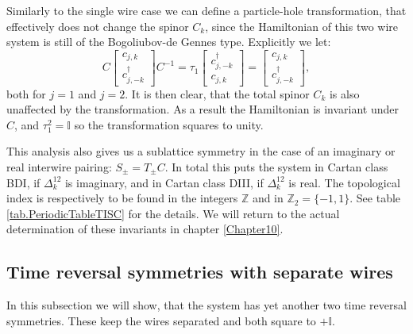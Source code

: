 Similarly to the single wire case we can define a particle-hole transformation, that effectively does not change the spinor $C_k$, since the Hamiltonian of this two wire system is still of the Bogoliubov-de Gennes type. Explicitly we let:
\begin{equation}
C\begin{bmatrix} c_{j,k} \\ c^\dagger_{j,-k} \end{bmatrix}C^{-1} = \tau_1 \begin{bmatrix} c^\dagger_{j,-k} \\ c_{j,k} \end{bmatrix} = \begin{bmatrix} c_{j,k} \\ c^\dagger_{j,-k} \end{bmatrix}, 
\end{equation} 
both for $j=1$ and $j=2$. It is then clear, that the total spinor $C_k$ is also unaffected by the transformation. As a result the Hamiltonian is invariant under $C$, and $\tau_1^2 = \mathbb{I}$ so the transformation squares to unity. 

This analysis also gives us a sublattice symmetry in the case of an imaginary or real interwire pairing: $S_\pm = T_\pm C$. In total this puts the system in Cartan class BDI, if $\Delta^{12}_k$ is imaginary, and in Cartan class DIII, if $\Delta^{12}_k$ is real. The topological index is respectively to be found in the integers $\mathbb{Z}$ and in $\mathbb{Z}_2 = \{-1,1\}$. See table \ref{tab.PeriodicTableTISC} for the details. We will return to the actual determination of these invariants in chapter \ref{Chapter10}. 

\subsection{Time reversal symmetries with separate wires} 
\label{subsec.TRseparatewires}
In this subsection we will show, that the system has yet another two time reversal symmetries. These keep the wires separated and both square to $+\mathbb{I}$. 

